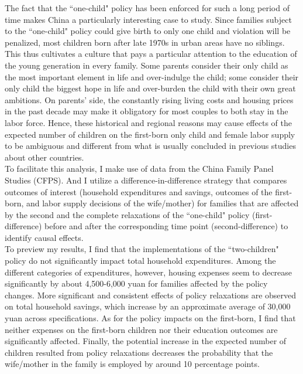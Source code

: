 \documentclass[12pt]{extarticle}
\begin{document}
\indent The fact that the ``one-child" policy has been enforced for such a long period of time makes China a particularly interesting case to study. Since families subject to the ``one-child" policy could give birth to only one child and violation will be penalized, most children born after late 1970s in urban areas have no siblings. This thus cultivates a culture that pays a particular attention to the education of the young generation in every family. Some parents consider their only child as the most important element in life and over-indulge the child; some consider their only child the biggest hope in life and over-burden the child with their own great ambitions. On parents' side, the constantly rising living costs and housing prices in the past decade may make it obligatory for most couples to both stay in the labor force. Hence, these historical and regional reasons may cause effects of the expected number of children on the first-born only child and female labor supply to be ambiguous and different from what is usually concluded in previous studies about other countries. \\
\indent To facilitate this analysis, I make use of data from the China Family Panel Studies (CFPS). And I utilize a difference-in-difference strategy that compares outcomes of interest (household expenditures and savings, outcomes of the first-born, and labor supply decisions of the wife/mother) for families that are affected by the second and the complete relaxations of the ``one-child" policy (first-difference) before and after the corresponding time point (second-difference) to identify causal effects. \\
\indent To preview my results, I find that the implementations of the ``two-children" policy do not significantly impact total household expenditures. Among the different categories of expenditures, however, housing expenses seem to decrease significantly by about 4,500-6,000 yuan for families affected by the policy changes. More significant and consistent effects of policy relaxations are observed on total household savings, which increase by an approximate average of 30,000 yuan across specifications. As for the policy impacts on the first-born, I find that neither expenses on the first-born children nor their education outcomes are significantly affected. Finally, the potential increase in the expected number of children resulted from policy relaxations decreases the probability that the wife/mother in the family is employed by around 10 percentage points. \\ 
\end{document}
